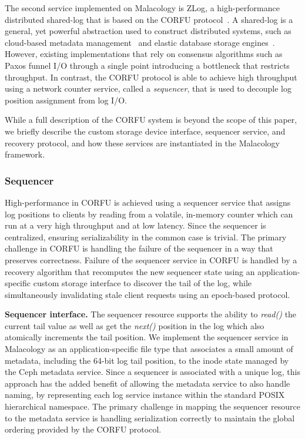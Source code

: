 \documentclass[preprint]{sigplanconf-eurosys}
\begin{document}
The second service implemented on Malacology is ZLog, a high-performance
distributed shared-log that is based on the CORFU
protocol~\cite{balakrishnan_corfu_2012}. A shared-log is a general, yet
powerful abstraction used to construct distributed systems, such as
cloud-based metadata management~\cite{balakrishnan:sosp13} and elastic database
storage engines~\cite{bernstein:cidr11,bernstein:vldb11,bernstein:sigmod15}.
However, existing implementations that rely on consensus algorithms such as
Paxos funnel I/O through a single point introducing a bottleneck that restricts
throughput.  In contrast, the CORFU protocol is able to achieve high throughput
using a network counter service, called a \emph{sequencer}, that is used to
decouple log position assignment from log I/O.

While a full description of the CORFU system is beyond the scope of this
paper, we briefly describe the custom storage device interface, sequencer
service, and recovery protocol, and how these services are instantiated in the
Malacology framework.

\subsubsection{Sequencer}
\label{sec:seq}

High-performance in CORFU is achieved using a sequencer service that assigns
log positions to clients by reading from a volatile, in-memory counter which
can run at a very high throughput and at low latency. Since the sequencer
is centralized, ensuring serializability in the common case is trivial.  The
primary challenge in CORFU is handling the failure of the sequencer in a way
that preserves correctness. Failure of the sequencer service in CORFU is
handled by a recovery algorithm that recomputes the new sequencer state using
an application-specific custom storage interface to discover the tail of the
log, while simultaneously invalidating stale client requests using an
epoch-based protocol.

{\bf Sequencer interface.} The sequencer resource supports the ability to
\emph{read()} the current tail value as well as get the \emph{next()} position in
the log which also atomically increments the tail position.
We implement the sequencer service in Malacology as an application-specific
file type that associates a small amount of metadata, including the 64-bit log
tail position, to the inode state managed by the Ceph metadata service. Since
a sequencer is associated with a unique log, this approach has the added
benefit of allowing the metadata service to also handle naming, by
representing each log service instance within the standard POSIX hierarchical
namespace. The primary challenge in mapping the sequencer resource to the
metadata service is handling serialization correctly to maintain the global
ordering provided by the CORFU protocol.
\end{document}
